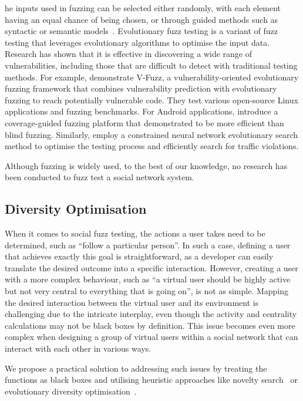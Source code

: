 \documentclass[dvipsnames,format=sigconf,anonymous=False,review=false, balance=false]{acmart}
\begin{document}
he inputs used in fuzzing can be selected either randomly, with each element having an equal chance of being chosen, or through guided methods such as syntactic or semantic models~\cite{MARIANI2015bbtesting}. 
Evolutionary fuzz testing is a variant of fuzz testing that leverages evolutionary algorithms to optimise the input data. Research has shown that it is effective in discovering a wide range of vulnerabilities, including those that are difficult to detect with traditional testing methods. For example, \citet{li2019v} demonstrate V-Fuzz, a vulnerability-oriented evolutionary fuzzing framework that combines vulnerability prediction with evolutionary fuzzing to 
reach potentially vulnerable code. They test various open-source Linux applications and fuzzing benchmarks. 
For Android applications, \citet{Cotroneo_2019} introduce a coverage-guided fuzzing platform that demonstrated to be more efficient than blind fuzzing. 
Similarly, \citet{9847081} employ a constrained neural network evolutionary search method to optimise the testing process and efficiently search for traffic violations.

Although fuzzing is widely used, to the best of our knowledge, no research has been conducted to fuzz test a social network system. 

\subsection{Diversity Optimisation}\label{sec:diversityopt}

When it comes to social fuzz testing, the actions a user takes need to be determined, such as ``follow a particular person''. In such a case, defining a user that achieves exactly this goal is straightforward, as a developer can easily translate the desired outcome into a specific interaction. 
However, creating a user with a more complex behaviour, such as ``a virtual user should be highly active but not very central to everything that is going on'', is not as simple. Mapping the desired interaction between the virtual user and its environment is challenging due to the intricate interplay, even though the activity and centrality calculations may not be black boxes by definition. 
This issue becomes even more complex when designing a group of virtual users within a social network that can interact with each other in various ways.

We propose a practical solution to addressing such issues by treating the functions as black boxes and utilising heuristic approaches like novelty search~\cite{DBLP:conf/gecco/RisiVHS09} or evolutionary diversity optimisation~\cite{DBLP:conf/gecco/UlrichT11}. 
\end{document}
